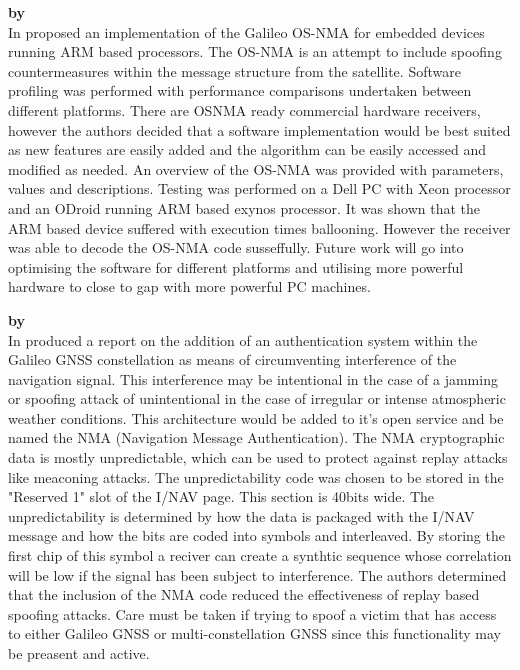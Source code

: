 \medskip

\textbf{\emph{} by \citeauthor{RN36}} \\
In \citeyear{RN36} \citeauthor{RN36} \cite{RN36} proposed an implementation of the Galileo OS-NMA for embedded devices running ARM based processors. The OS-NMA is an
attempt to include spoofing countermeasures within the message structure from the satellite. Software profiling was performed with performance comparisons undertaken
between different platforms. There are OSNMA ready commercial hardware receivers, however the authors decided that a software implementation would be best suited as new
features are easily added and the algorithm can be easily accessed and modified as needed. An overview of the OS-NMA was provided with parameters, values and
descriptions. Testing was performed on a Dell PC with Xeon processor and an ODroid running ARM based exynos processor. It was shown that the ARM based device suffered
with execution times ballooning. However the receiver was able to decode the OS-NMA code susseffully. Future work will go into optimising the software for different
platforms and utilising more powerful hardware to close to gap with more powerful PC machines.

\medskip

\textbf{\emph{} by \citeauthor{RN37}} \\
In \citeyear{RN37} \citeauthor{RN37} \cite{RN37} produced a report on the addition of an authentication system within the Galileo GNSS constellation as means of
circumventing interference of the navigation signal. This interference may be intentional in the case of a jamming or spoofing attack of unintentional in the case of
irregular or intense atmospheric weather conditions. This architecture would be added to it's open service and be named the NMA (Navigation Message Authentication). The
NMA cryptographic data is mostly unpredictable, which can be used to protect against replay attacks like meaconing attacks. The unpredictability code was chosen to be
stored in the "Reserved 1" slot of the I/NAV page. This section is 40bits wide. The unpredictability is determined by how the data is packaged with the I/NAV message and
how the bits are coded into symbols and interleaved. By storing the first chip of this symbol a reciver can  create a synthtic sequence whose correlation will be low if
the signal has been subject to interference. The authors determined that the inclusion of the NMA code reduced the effectiveness of replay based spoofing attacks.
Care must be taken if trying to spoof a victim that has access to either Galileo GNSS or multi-constellation GNSS since this functionality may be preasent and active. 

